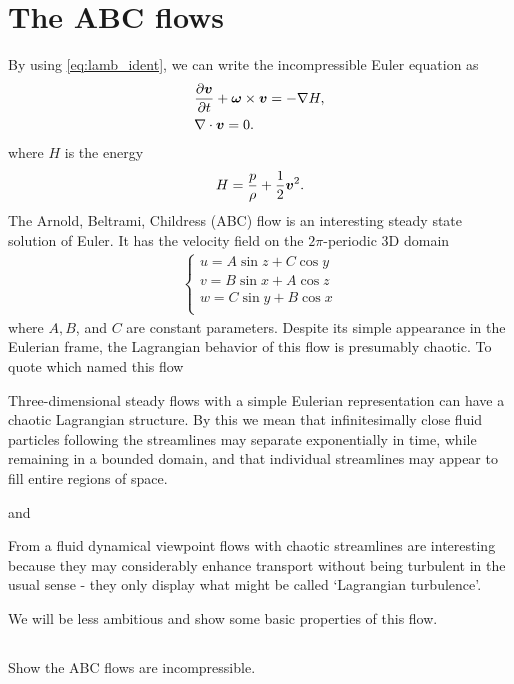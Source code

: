 \documentclass[11pt,letterpaper]{article}
\begin{document}
\section{The ABC flows}
By using \eqref{eq:lamb_ident}, we can write the incompressible Euler equation as
\begin{align}
    &\frac{\partial\boldsymbol{v}}{\partial t}+\boldsymbol{\omega}\times\boldsymbol{v} = -\nabla H,\\
    &\nabla\cdot\boldsymbol{v} = 0.
\end{align}
where $H$ is the energy
\begin{align}
    H = \frac{p}{\rho}+\frac{1}{2}\boldsymbol{v}^2.
\end{align}
The Arnold, Beltrami, Childress (ABC) flow is an interesting steady state solution of Euler. It has the velocity field on the $2\pi$-periodic 3D domain
\begin{align}
    \begin{cases}
        u= A\sin z+C\cos y\\
        v= B\sin x+A\cos z\\
        w= C\sin y+B\cos x\\
    \end{cases}
\end{align}
where $A,B$, and $C$ are constant parameters. Despite its simple appearance in the Eulerian frame, the Lagrangian behavior of this flow is presumably chaotic. To quote \cite{DombreEtAl_86} which named this flow
\begin{displayquote}
Three-dimensional steady flows with a simple Eulerian representation can have a chaotic Lagrangian structure. By this we mean that infinitesimally close fluid particles following the streamlines may separate exponentially in time, while remaining in a bounded domain, and that individual streamlines may appear to fill entire regions of space.
\end{displayquote}
and
\begin{displayquote}
    From a fluid dynamical viewpoint flows with chaotic streamlines are interesting because they may considerably enhance transport without being turbulent in the usual sense - they only display what might be called `Lagrangian turbulence'.
\end{displayquote}

We will be less ambitious and show some basic properties of this flow.
\subsection{}
Show the ABC flows are incompressible.
\end{document}
